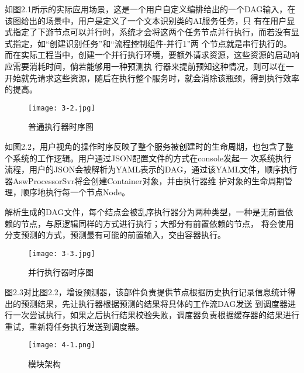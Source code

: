 如图2.1所示的实际应用场景，这是一个用户自定义编排给出的一个DAG输入，在该图给出的场景中，用户是定义了一个文本识别类的AI服务任务，只
有在用户显式指定了下游节点可以并行时，系统才会将这两个任务节点并行执行，而若没有显式指定，如“创建识别任务”和“流程控制组件-并行1”两
个节点就是串行执行的。而在实际工程当中，创建一个并行执行环境，要额外请求资源，这些资源的启动响应需要消耗时间，倘若能够用一种预测执
行器来提前预知这种情况，则可以在一开始就先请求这些资源，随后在执行整个服务时，就会消除该瓶颈，得到执行效率的提高。



\begin{figure}[H]
    \centering
    \texttt{[image: 3-2.jpg]}
    \caption{普通执行器时序图}
    \label{fig:普通执行器时序图}
\end{figure}

如图2.2，用户视角的操作时序反映了整个服务被创建时的生命周期，也包含了整个系统的工作逻辑。用户通过JSON配置文件的方式在console发起一
次系统执行流程，用户的JSON会被解析为YAML表示的DAG，通过该YAML文件，顺序执行器AswProcessorSvr将会创建Container对象，并由执行器维
护对象的生命周期管理，顺序地执行每一个节点Node。

解析生成的DAG文件，每个结点会被乱序执行器分为两种类型，一种是无前置依赖的节点，与原逻辑同样的方式进行执行；大部分有前置依赖的节点，
将会使用分支预测的方式，预测最有可能的前置输入，交由容器执行。\cite{peng2021modelbased}

\begin{figure}[H]
    \centering
    \texttt{[image: 3-3.jpg]}
    \caption{并行执行器时序图}
    \label{fig:并行执行器时序图}
\end{figure}

图2.3对比图2.2，增设预测器，该部件负责提供节点根据历史执行记录信息统计得出的预测结果，先让执行器根据预测的结果将具体的工作流DAG发送
到调度器进行一次尝试执行，如果之后执行结果校验失败，调度器负责根据缓存器的结果进行重试，重新将任务执行发送到调度器。


\begin{figure}[H]
    \centering
    \texttt{[image: 4-1.png]}
    \caption{模块架构}
    \label{fig:模块架构}
\end{figure}


